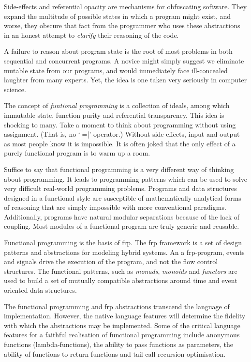 Side-effects and referential opacity are mechanisms for obfuscating software.
They expand the multitude of possible states in which a program might exist, and
worse, they obscure that fact from the programmer who uses these abstractions in
an honest attempt to \emph{clarify} their reasoning of the code.

A failure to reason about program state is the root of most problems in both
sequential and concurrent programs. A novice might simply suggest we eliminate
mutable state from our programs, and would immediately face ill-concealed
laughter from many experts. Yet, the idea is one taken very seriously in
computer science.

The concept of \emph{funtional programming} is a collection of ideals, among
which immutable state, function purity and referential transparency. This idea
is shocking to many. Take a moment to think about programming without using
assignment. (That is, no `|=|' operator.) Without side effects, input and output
as most people know it is impossible. It is often joked that the only effect of
a purely functional program is to warm up a room.

Suffice to say that functional programming is a very different way of thinking
about programming. It leads to programming patterns which can be used to solve
very difficult real-world programming problems. Programs and data structures
designed in a functional style are susceptible of mathematically analytical
forms of reasoning that are simply impossible with more conventional paradigms.
Additionally, programs have natural modular separations because of the lack of
coupling. Most modules of a functional program are truly generic and reusable.

Functional programming is the basis of \ac{frp}. The \ac{frp} framework is a set of design patterns and
abstractions for modeling hybrid systems. An a \ac{frp}-program, events and
signals drive the execution of the program, and not the flow control structures.
The functional patterns, such as \emph{monads},
\emph{monoids} and \emph{functors} are used to
build a set of mutually compatible abstractions around time and event oriented
data structures.

The functional programming and \ac{frp} abstractions transcend the language of
implementation. However, the native language features will determine the
fidelity with which the abstractions may be implemented. Some of the critical
language features for a faithful realisation of functional programming include
anonymous functions (lambda-functions), the ability to pass functions as
parameters, the ability of functions to return functions and tail call recursion
optimisation.

